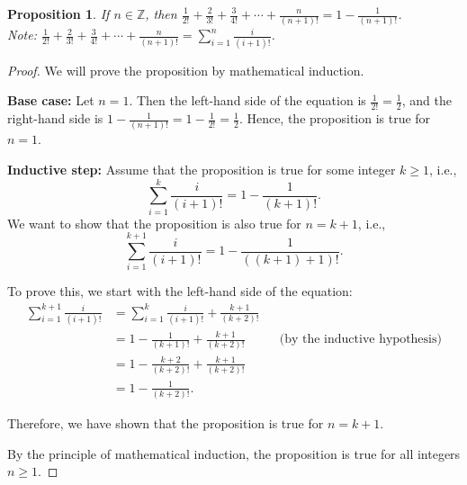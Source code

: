 \documentclass{article}
\newtheorem*{theorem}{Proposition}
\begin{document}
\begin{theorem}
    If $n \in \mathbb{Z}$, then $\frac{1}{2!} + \frac{2}{3!} + \frac{3}{4!} + \cdots + \frac{n}{(n+1)!} = 1 - \frac{1}{(n + 1)!}$. \\
    Note: $\frac{1}{2!} + \frac{2}{3!} + \frac{3}{4!} + \cdots + \frac{n}{(n+1)!} = \sum_{i=1}^{n}{\frac{i}{(i+1)!}}$.
\end{theorem}
\begin{proof}
We will prove the proposition by mathematical induction.

\textbf{Base case:} Let $n=1$. Then the left-hand side of the equation is $\frac{1}{2!} = \frac{1}{2}$, and the right-hand side is $1 - \frac {1}{(n+1)!} = 1 - \frac{1}{2!} = \frac{1}{2}$. Hence, the proposition is true for $n=1$. 

\textbf{Inductive step:} Assume that the proposition is true for some integer $k\geq1$, i.e., 
\[\sum_{i=1}^{k}{\frac{i}{(i+1)!}} = 1 - \frac{1}{(k + 1)!}.\]
We want to show that the proposition is also true for $n=k+1$, i.e., 
\[\sum_{i=1}^{k+1}{\frac{i}{(i+1)!}} = 1 - \frac{1}{((k+1) + 1)!}.\]

To prove this, we start with the left-hand side of the equation:
\begin{align*}
    \sum_{i=1}^{k+1}{\frac{i}{(i+1)!}} &= \sum_{i=1}^{k}{\frac{i}{(i+1)!}} + \frac{k+1}{(k+2)!} && \\
    &= 1 - \frac{1}{(k + 1)!} + \frac{k+1}{(k+2)!} && \text{(by the inductive hypothesis)} \\
    &= 1 - \frac{k+2}{(k+2)!} + \frac{k+1}{(k+2)!} && \\
    &= 1 - \frac{1}{(k+2)!}.
\end{align*}

Therefore, we have shown that the proposition is true for $n=k+1$. 

By the principle of mathematical induction, the proposition is true for all integers $n\geq1$. 
\end{proof}
\end{document}
